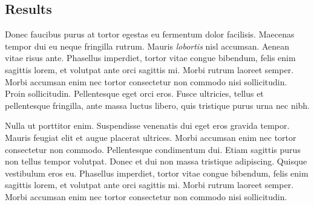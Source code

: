 \documentclass[a0,portrait]{a0poster}
\begin{document}
\begin{multicols}{2}

\section*{Results}

Donec faucibus purus at tortor egestas eu fermentum dolor facilisis.
Maecenas tempor dui eu neque fringilla rutrum. Mauris \emph{lobortis} nisl
accumsan. Aenean vitae risus ante.
%
%
Phasellus imperdiet, tortor vitae congue bibendum, felis enim sagittis
lorem, et volutpat ante orci sagittis mi. Morbi rutrum laoreet semper.
Morbi accumsan enim nec tortor consectetur non commodo nisi sollicitudin.
Proin sollicitudin. Pellentesque eget orci eros. Fusce ultricies, tellus
et pellentesque fringilla, ante massa luctus libero, quis tristique purus
urna nec nibh.

Nulla ut porttitor enim. Suspendisse venenatis dui eget eros gravida
tempor. Mauris feugiat elit et augue placerat ultrices. Morbi accumsan
enim nec tortor consectetur non commodo. Pellentesque condimentum dui.
Etiam sagittis purus non tellus tempor volutpat. Donec et dui non massa
tristique adipiscing. Quisque vestibulum eros eu. Phasellus imperdiet,
tortor vitae congue bibendum, felis enim sagittis lorem, et volutpat ante
orci sagittis mi. Morbi rutrum laoreet semper. Morbi accumsan enim nec
tortor consectetur non commodo nisi sollicitudin.



\end{multicols}
\end{document}

